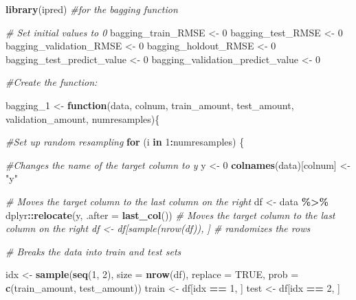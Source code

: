 \documentclass[
]{book}
\newenvironment{Shaded}{\begin{snugshade}}{\end{snugshade}}
\newcommand{\AttributeTok}[1]{\textcolor[rgb]{0.13,0.29,0.53}{#1}}
\newcommand{\CommentTok}[1]{\textcolor[rgb]{0.56,0.35,0.01}{\textit{#1}}}
\newcommand{\ConstantTok}[1]{\textcolor[rgb]{0.56,0.35,0.01}{#1}}
\newcommand{\ControlFlowTok}[1]{\textcolor[rgb]{0.13,0.29,0.53}{\textbf{#1}}}
\newcommand{\DecValTok}[1]{\textcolor[rgb]{0.00,0.00,0.81}{#1}}
\newcommand{\FunctionTok}[1]{\textcolor[rgb]{0.13,0.29,0.53}{\textbf{#1}}}
\newcommand{\NormalTok}[1]{#1}
\newcommand{\OtherTok}[1]{\textcolor[rgb]{0.56,0.35,0.01}{#1}}
\newcommand{\SpecialCharTok}[1]{\textcolor[rgb]{0.81,0.36,0.00}{\textbf{#1}}}
\newcommand{\StringTok}[1]{\textcolor[rgb]{0.31,0.60,0.02}{#1}}
\begin{document}
\begin{Shaded}
\begin{Highlighting}[]
\FunctionTok{library}\NormalTok{(ipred) }\CommentTok{\#for the bagging function}

\CommentTok{\# Set initial values to 0}
\NormalTok{bagging\_train\_RMSE }\OtherTok{\textless{}{-}} \DecValTok{0}
\NormalTok{bagging\_test\_RMSE }\OtherTok{\textless{}{-}} \DecValTok{0}
\NormalTok{bagging\_validation\_RMSE }\OtherTok{\textless{}{-}} \DecValTok{0}
\NormalTok{bagging\_holdout\_RMSE }\OtherTok{\textless{}{-}} \DecValTok{0}
\NormalTok{bagging\_test\_predict\_value }\OtherTok{\textless{}{-}} \DecValTok{0}
\NormalTok{bagging\_validation\_predict\_value }\OtherTok{\textless{}{-}} \DecValTok{0}

\CommentTok{\#Create the function:}

\NormalTok{bagging\_1 }\OtherTok{\textless{}{-}} \ControlFlowTok{function}\NormalTok{(data, colnum, train\_amount, test\_amount, validation\_amount, numresamples)\{}

\CommentTok{\#Set up random resampling}
\ControlFlowTok{for}\NormalTok{ (i }\ControlFlowTok{in} \DecValTok{1}\SpecialCharTok{:}\NormalTok{numresamples) \{}

\CommentTok{\#Changes the name of the target column to y}
\NormalTok{y }\OtherTok{\textless{}{-}} \DecValTok{0}
\FunctionTok{colnames}\NormalTok{(data)[colnum] }\OtherTok{\textless{}{-}} \StringTok{"y"}

\CommentTok{\# Moves the target column to the last column on the right}
\NormalTok{df }\OtherTok{\textless{}{-}}\NormalTok{ data }\SpecialCharTok{\%\textgreater{}\%}\NormalTok{ dplyr}\SpecialCharTok{::}\FunctionTok{relocate}\NormalTok{(y, }\AttributeTok{.after =} \FunctionTok{last\_col}\NormalTok{()) }\CommentTok{\# Moves the target column to the last column on the right df \textless{}{-} df[sample(nrow(df)), ] \# randomizes the rows}

\CommentTok{\# Breaks the data into train and test sets}

\NormalTok{idx }\OtherTok{\textless{}{-}} \FunctionTok{sample}\NormalTok{(}\FunctionTok{seq}\NormalTok{(}\DecValTok{1}\NormalTok{, }\DecValTok{2}\NormalTok{), }\AttributeTok{size =} \FunctionTok{nrow}\NormalTok{(df), }\AttributeTok{replace =} \ConstantTok{TRUE}\NormalTok{, }\AttributeTok{prob =} \FunctionTok{c}\NormalTok{(train\_amount, test\_amount))}
\NormalTok{train }\OtherTok{\textless{}{-}}\NormalTok{ df[idx }\SpecialCharTok{==} \DecValTok{1}\NormalTok{, ]}
\NormalTok{test }\OtherTok{\textless{}{-}}\NormalTok{ df[idx }\SpecialCharTok{==} \DecValTok{2}\NormalTok{, ]}


\end{Highlighting}
\end{Shaded}
\end{document}
